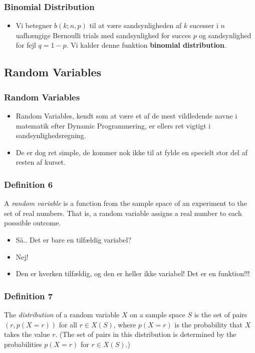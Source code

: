 \documentclass{beamer}
\begin{document}
\begin{frame}
  \frametitle{Binomial Distribution}
  \begin{itemize}
  \item Vi betegner $b(k;n,p)$ til at være sandsynligheden af $k$ sucesser i $n$ uafhængige Bernoulli trials med sandsynlighed for succes $p$ og sandsynlighed for fejl $q = 1-p$. Vi kalder denne funktion \textbf{binomial distribution}. 
  \end{itemize}
\end{frame}

\subsection{Random Variables}
\label{subsec:random-variables}

\begin{frame}
  \frametitle{Random Variables}
  \begin{itemize}
  \item Random Variables, kendt som at være et af de mest vildledende navne i matematik efter Dynamic Programmering, er ellers ret vigtigt i sandsynlighedsregning.
  \item De er dog ret simple, de kommer nok ikke til at fylde en specielt stor del af resten af kurset.
  \end{itemize} 
\end{frame}

\begin{frame}
  \frametitle{Definition 6}
  \begin{definition}
    A \textit{random variable} is a function from the sample space of an experiment to the set of real numbers. That is, a random variable assigns a real number to each posssible outcome.
  \end{definition}
  \begin{itemize}
  \item Så.. Det er bare en tilfældig variabel?
  \item Nej!
  \item Den er hverken tilfældig, og den er heller ikke variabel! Det er en funktion!!!
  \end{itemize}
\end{frame}

\begin{frame}
  \frametitle{Definition 7}
  \begin{definition}
    The \textit{distribution} of a random variable $X$ on a sample space $S$ is the set of pairs $(r, p(X=r))$  for all $r \in X(S)$, where $p(X=r)$ is the probability that $X$ takes the value $r$. (The set of pairs in this distribution is determined by the probabilities $p(X=r)$ for $r \in X(S)$.)
  \end{definition}
\end{frame}
\end{document}
